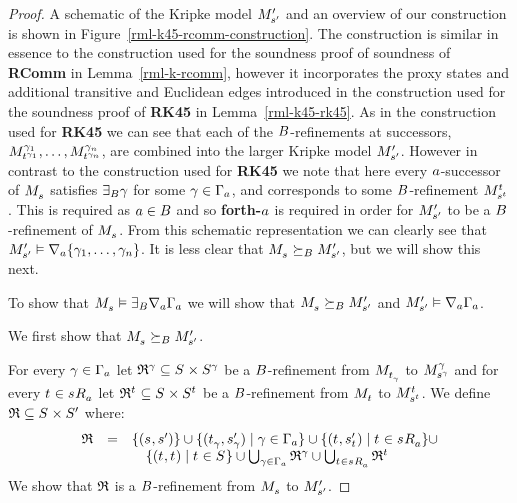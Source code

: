 \begin{proof}
A schematic of the Kripke model $\kPModelP{\kStateSP}$ and an overview of our construction is shown in Figure~\ref{rml-k45-rcomm-construction}.
The construction is similar in essence to the construction used for the soundness proof of soundness of {\bf RComm} in Lemma~\ref{rml-k-rcomm}, however it incorporates the proxy states and additional transitive and Euclidean edges introduced in the construction used for the soundness proof of {\bf RK45} in Lemma~\ref{rml-k45-rk45}.
As in the construction used for {\bf RK45} we can see that each of the $\agentsB$-refinements at successors, $\kPModel[\gamma_1]{\kStateT[\gamma_1]}, \dots, \kPModel[\gamma_n]{\kStateT[\gamma_n]}$, are combined into the larger Kripke model $\kPModelP{\kStateSP}$.
However in contrast to the construction used for {\bf RK45} we note that here every $\agentA$-successor of $\kPModel{\kStateS}$ satisfies $\somerefsBs \gamma$ for some $\gamma \in \Gamma_\agentA$, and corresponds to some $\agentsB$-refinement $\kPModel[\kStateT]{\kStateS[\kStateT]}$.
This is required as $\agentA \in \agentsB$ and so {\bf forth-$\agentA$} is required in order for $\kPModelP{\kStateSP}$ to be a $\agentsB$-refinement of $\kPModel{\kStateS}$.
From this schematic representation we can clearly see that $\kPModelP{\kStateSP} \entails \coversA \{\gamma_1, \dots, \gamma_n\}$.
It is less clear that $\kPModel{\kStateS} \simulatesBs \kPModelP{\kStateSP}$, but we will show this next.

To show that $\kPModel{\kStateS} \entails \somerefsBs \coversA \Gamma_\agentA$ we will show that $\kPModel{\kStateS} \simulatesBs \kPModelP{\kStateSP}$ and $\kPModelP{\kStateSP} \entails \coversA \Gamma_\agentA$.

We first show that $\kPModel{\kStateS} \simulatesBs \kPModelP{\kStateSP}$.

For every $\gamma \in \Gamma_\agentA$ let $\refinement^\gamma \subseteq \kStates \times \kStates[\gamma]$ be a $\agentsB$-refinement from $\kPModel{\kStateT_\gamma}$ to $\kPModel[\gamma]{\kStateS[\gamma]}$ and
for every $\kStateT \in \kSuccessorsA{\kStateS}$ let $\refinement^{\kStateT} \subseteq \kStates \times \kStates[\kStateT]$ be a $\agentsB$-refinement from $\kPModel{\kStateT}$ to $\kPModel[\kStateT]{\kStateS[\kStateT]}$.
We define $\refinement \subseteq \kStates \times \kStatesP$ where:
$$
\begin{array}{rcl}
    \refinement &=& \{(\kStateS, \kStateSP)\} \cup \{(\kStateT_\gamma, \kStateSP_\gamma) \mid \gamma \in \Gamma_\agentA\} \cup \{(\kStateT, \kStateSP_{\kStateT}) \mid \kStateT \in \kSuccessorsA{\kStateS}\} \cup \\&&\quad \{(\kStateT, \kStateT) \mid \kStateT \in \kStates\} \cup \bigcup_{\gamma \in \Gamma_\agentA} \refinement^\gamma \cup \bigcup_{\kStateT \in \kSuccessorsA{\kStateS}} \refinement^{\kStateT}
\end{array}
$$
We show that $\refinement$ is a $\agentsB$-refinement from $\kPModel{\kStateS}$ to $\kPModelP{\kStateSP}$.


\end{proof}
